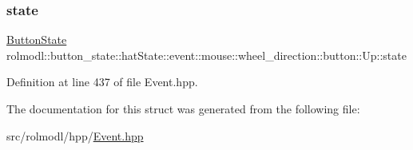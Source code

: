 \subsubsection{\texorpdfstring{state}{state}}
{\footnotesize\ttfamily \mbox{\hyperlink{namespacerolmodl_ad08ec5c56aa1db118f871357b2d475fd}{Button\+State}} rolmodl\+::button\+\_\+state\+::hat\+State\+::event\+::mouse\+::wheel\+\_\+direction\+::button\+::\+Up\+::state}



Definition at line 437 of file Event.\+hpp.



The documentation for this struct was generated from the following file\+:\begin{DoxyCompactItemize}
\item 
src/rolmodl/hpp/\mbox{\hyperlink{_event_8hpp}{Event.\+hpp}}\end{DoxyCompactItemize}
